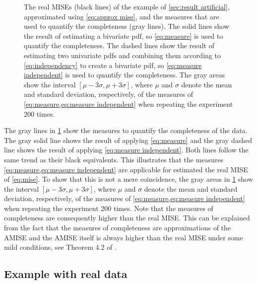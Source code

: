 \setlength\figurewidth{\linewidth}
\setlength{}
\begin{figure}
	\centering
	
	\caption{The real MISEs (black lines) of the example of \cref{sec:result artificial}, approximated using \cref{eq:approx mise}, and the measures that are used to quantify the completeness (gray lines). The solid lines show the result of estimating a bivariate pdf, so \cref{eq:measure} is used to quantify the completeness. The dashed lines show the result of estimating two univariate pdfs and combining them according to \cref{eq:independency} to create a bivariate pdf, so \cref{eq:measure independent} is used to quantify the completeness. The gray areas show the interval $[\mu-3\sigma,\mu+3\sigma]$, where $\mu$ and $\sigma$ denote the mean and standard deviation, respectively, of the measures of \cref{eq:measure,eq:measure independent} when repeating the experiment 200 times.} 
	\label{fig:mise example}
\end{figure}

The gray lines in \cref{fig:mise example} show the measures to quantify the completeness of the data. The gray solid line shows the result of applying \cref{eq:measure} and the gray dashed line shows the result of applying \cref{eq:measure independent}. Both lines follow the same trend as their black equivalents. This illustrates that the measures \cref{eq:measure,eq:measure independent} are applicable for estimated the real MISE of \cref{eq:mise}. To show that this is not a mere coincidence, the gray areas in \cref{fig:mise example} show the interval $[\mu-3\sigma,\mu+3\sigma]$, where $\mu$ and $\sigma$ denote the mean and standard deviation, respectively, of the measures of \cref{eq:measure,eq:measure independent} when repeating the experiment 200 times. Note that the measures of completeness are consequently higher than the real MISE. This can be explained from the fact that the measures of completeness are approximations of the AMISE and the AMISE itself is always higher than the real MISE under some mild conditions, see Theorem 4.2 of \textcite{marron1992exact}.

\subsection{Example with real data}
\label{sec:result real}

